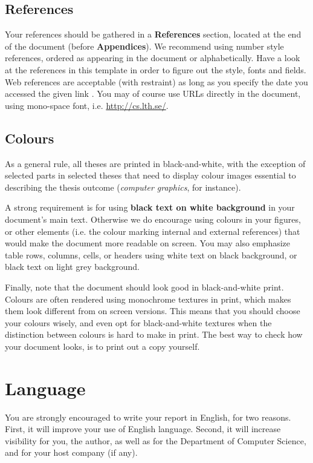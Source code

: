 \documentclass{cslthse-msc}
\begin{document}
\section{References}
Your references should be gathered in a \textbf{References} section, located at the end of the document (before \textbf{Appendices}). We recommend using number style references, ordered as appearing in the document or alphabetically. Have a look at the references in this template in order to figure out the style, fonts and fields. Web references are acceptable (with restraint) as long as you specify the date you accessed the given link \cite{fontspec, CTAN}. You may of course use URLs directly in the document, using mono-space font, i.e. \url{http://cs.lth.se/}.

\section{Colours}
As a general rule, all theses are printed in black-and-white, with the exception of selected parts in selected theses that need to display colour images essential to describing the thesis outcome (\textit{computer graphics}, for instance).

A strong requirement is for using \textbf{black text on white background} in your document's main text. Otherwise we do encourage using colours in your figures, or other elements (i.e. the colour marking internal and external references) that would make the document more readable on screen. You may also emphasize table rows, columns, cells, or headers using white text on black background, or black text on light grey background.

Finally, note that the document should look good in black-and-white print. Colours are often rendered using monochrome textures in print, which makes them look different from on screen versions. This means that you should choose your colours wisely, and even opt for black-and-white textures when the distinction between colours is hard to make in print. The best way to check how your document looks, is to print out a copy yourself.

\chapter{Language}

You are strongly encouraged to write your report in English, for two reasons. First, it will improve your use of English language. Second, it will increase visibility for you, the author, as well as for the Department of Computer Science, and for your host company (if any).
\end{document}
